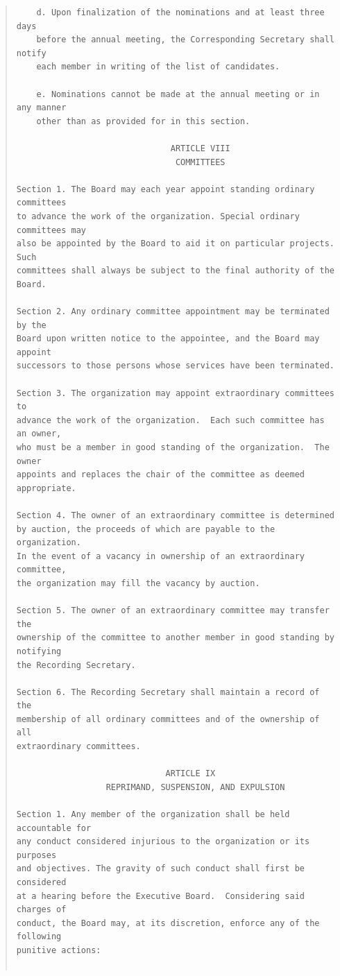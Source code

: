 \documentclass{article}
\begin{document}
\begin{quote}
\begin{verbatim}
    d. Upon finalization of the nominations and at least three days
    before the annual meeting, the Corresponding Secretary shall notify
    each member in writing of the list of candidates.

    e. Nominations cannot be made at the annual meeting or in any manner
    other than as provided for in this section.

                               ARTICLE VIII
                                COMMITTEES

Section 1. The Board may each year appoint standing ordinary committees
to advance the work of the organization. Special ordinary committees may
also be appointed by the Board to aid it on particular projects. Such
committees shall always be subject to the final authority of the Board.

Section 2. Any ordinary committee appointment may be terminated by the
Board upon written notice to the appointee, and the Board may appoint
successors to those persons whose services have been terminated.

Section 3. The organization may appoint extraordinary committees to
advance the work of the organization.  Each such committee has an owner,
who must be a member in good standing of the organization.  The owner
appoints and replaces the chair of the committee as deemed appropriate.

Section 4. The owner of an extraordinary committee is determined
by auction, the proceeds of which are payable to the organization.
In the event of a vacancy in ownership of an extraordinary committee,
the organization may fill the vacancy by auction.

Section 5. The owner of an extraordinary committee may transfer the
ownership of the committee to another member in good standing by notifying
the Recording Secretary.

Section 6. The Recording Secretary shall maintain a record of the
membership of all ordinary committees and of the ownership of all
extraordinary committees.

                              ARTICLE IX
                  REPRIMAND, SUSPENSION, AND EXPULSION

Section 1. Any member of the organization shall be held accountable for
any conduct considered injurious to the organization or its purposes
and objectives. The gravity of such conduct shall first be considered
at a hearing before the Executive Board.  Considering said charges of
conduct, the Board may, at its discretion, enforce any of the following
punitive actions:


\end{verbatim}
\end{quote}
\end{document}
